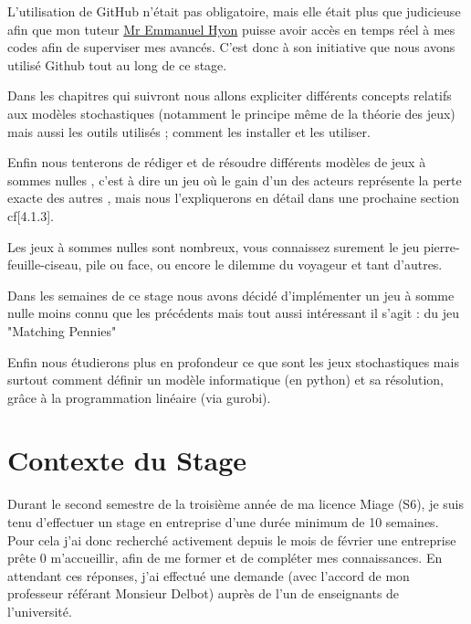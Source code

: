 \documentclass[a4paper, 12pt, twoside]{article}
\begin{document}
L'utilisation de \textsf{GitHub} n'était pas obligatoire, mais elle était plus que judicieuse afin que mon tuteur \underline{\textsf{Mr Emmanuel Hyon}} puisse avoir accès en temps réel à mes codes afin de superviser mes avancés. C'est donc à son initiative que nous avons utilisé \textsf{Github} tout au long de ce stage. \newline

Dans les chapitres qui suivront nous allons expliciter différents concepts relatifs aux \textsf{ modèles stochastiques} (notamment le principe même de la théorie des jeux) mais aussi les outils utilisés ; comment les installer et les utiliser. \newline

Enfin nous tenterons de rédiger et de résoudre différents modèles de \textsf{jeux à sommes nulles} , c'est à dire un jeu où le gain d'un des acteurs représente la perte exacte des autres , mais nous l'expliquerons en détail dans une prochaine section cf[4.1.3].  \newline

Les \textsf{jeux à sommes nulles} sont nombreux, vous connaissez surement le jeu \textsf{pierre-feuille-ciseau},  \textsf{pile ou face}, ou encore le \textsf{dilemme du voyageur} et tant d'autres. \newline

Dans les semaines de ce stage nous avons décidé d'implémenter un \textsf{jeu à somme nulle} moins connu que les précédents mais tout aussi intéressant il s'agit : du jeu  \textsf{ "Matching Pennies"}\newline

Enfin nous étudierons plus en profondeur ce que sont les jeux stochastiques mais surtout comment définir un modèle informatique (en \textsf{python}) et sa résolution, grâce à la programmation linéaire (via \textsf{gurobi}).

\newpage
\section{Contexte du Stage}
Durant le second semestre de la troisième année de ma licence Miage (S6), je suis tenu d'effectuer un stage en entreprise d'une durée minimum de 10 semaines. Pour cela j'ai donc recherché activement depuis le mois de février une entreprise prête 0 m'accueillir, afin de me former et de compléter mes connaissances. En attendant ces réponses, j'ai effectué une demande (avec l'accord de mon professeur référant \textsf{Monsieur Delbot}) auprès de l'un de enseignants de l'université. \newline
\end{document}
